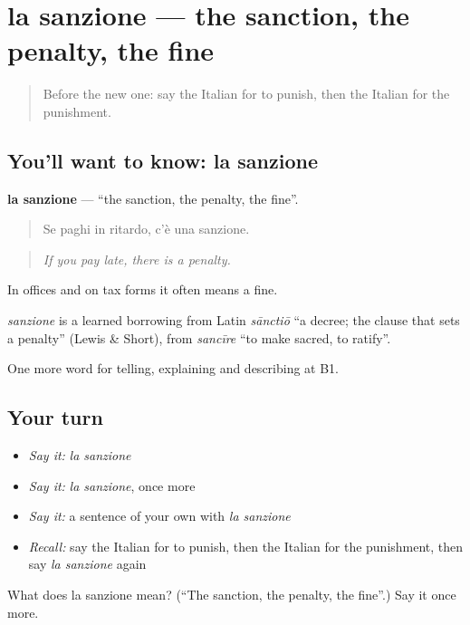 \section[la sanzione]{la sanzione — the sanction, the penalty, the fine}

\label{lesson:IT-C393-sanzione}



\begin{quote}
Before the new one: say the Italian for to punish, then the Italian for the punishment.
\end{quote}

\subsection*{You'll want to know: la sanzione}
\textbf{la sanzione} — \textquotedblleft{}the sanction, the penalty, the fine\textquotedblright{}.

\begin{quote}
Se paghi in ritardo, c'è una sanzione.
\end{quote}

\begin{quote}
\emph{If you pay late, there is a penalty.}
\end{quote}

In offices and on tax forms it often means a fine.

\begin{cousinweb}
\emph{sanzione} is a learned borrowing from Latin \emph{sānctiō} \textquotedblleft{}a decree; the clause that sets a penalty\textquotedblright{} (Lewis \& Short), from \emph{sancīre} \textquotedblleft{}to make sacred, to ratify\textquotedblright{}.
\end{cousinweb}

\begin{grammarlens}[title={What you've built}]
One more word for telling, explaining and describing at B1.
\end{grammarlens}

\subsection*{Your turn}
\begin{itemize}
\raggedright
  \item \emph{Say it:} \emph{la sanzione}
  \item \emph{Say it:} \emph{la sanzione}, once more
  \item \emph{Say it:} a sentence of your own with \emph{la sanzione}
  \item \emph{Recall:} say the Italian for to punish, then the Italian for the punishment, then say \emph{la sanzione} again
\end{itemize}

\begin{tcolorbox}[breakable,colback=teal!4,colframe=teal!35!black,title={Before you move on}]
What does la sanzione mean? (\textquotedblleft{}The sanction, the penalty, the fine\textquotedblright{}.) Say it once more.
\end{tcolorbox}
